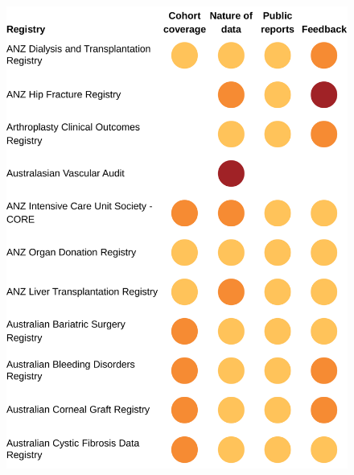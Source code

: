 \documentclass[FrontPage]{grattan}
\begin{document}
\begin{figure}
\includegraphics[page=2]{atlas/Registry_graphs.pdf}
\end{figure}
\end{document}
